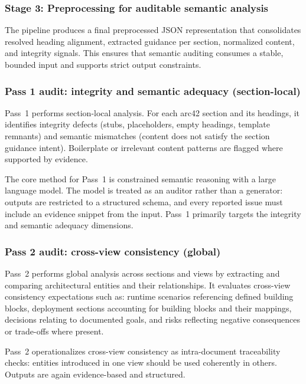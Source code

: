 \subsubsection{Stage 3: Preprocessing for auditable semantic analysis}
The pipeline produces a final preprocessed JSON representation that consolidates resolved heading alignment, extracted guidance per section, normalized content, and integrity signals. This ensures that semantic auditing consumes a stable, bounded input and supports strict output constraints.

\subsubsection{Pass 1 audit: integrity and semantic adequacy (section-local)}
Pass~1 performs section-local analysis. For each arc42 section and its headings, it identifies integrity defects (stubs, placeholders, empty headings, template remnants) and semantic mismatches (content does not satisfy the section guidance intent). Boilerplate or irrelevant content patterns are flagged where supported by evidence.

The core method for Pass~1 is constrained semantic reasoning with a large language model. The model is treated as an auditor rather than a generator: outputs are restricted to a structured schema, and every reported issue must include an evidence snippet from the input. Pass~1 primarily targets the integrity and semantic adequacy dimensions.

\subsubsection{Pass 2 audit: cross-view consistency (global)}
Pass~2 performs global analysis across sections and views by extracting and comparing architectural entities and their relationships. It evaluates cross-view consistency expectations such as: runtime scenarios referencing defined building blocks, deployment sections accounting for building blocks and their mappings, decisions relating to documented goals, and risks reflecting negative consequences or trade-offs where present.

Pass~2 operationalizes cross-view consistency as intra-document traceability checks: entities introduced in one view should be used coherently in others. Outputs are again evidence-based and structured.

